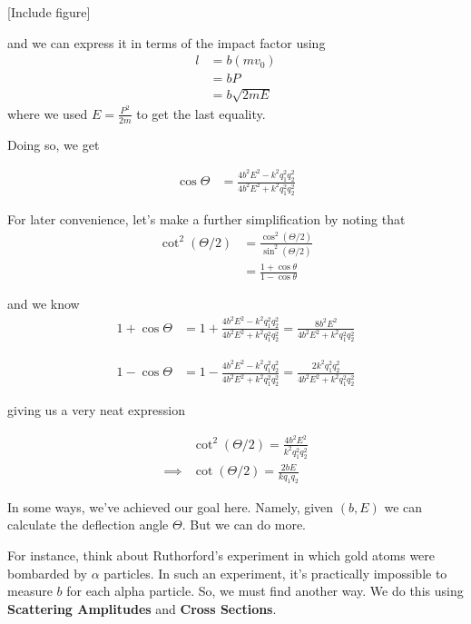 \documentclass[11pt]{article}
\begin{document}
\vskip 0.5cm
[Include figure]
\vskip 0.5cm

and we can express it in terms of the impact factor using
\begin{align*}
  l &= b(mv_0) \\
  &= b P \\
  &= b \sqrt{2mE} 
\end{align*}
where we used $E = \frac{P^2}{2m}$ to get the last equality.

\vskip 0.5cm
Doing so, we get 

\begin{align*}
  \cos\Theta &= \frac{4b^2 E^2 - k^2 q_1^2 q_2^2}{4b^2 E^2 + k^2 q_1^2 q_2^2}
\end{align*}

\vskip 0.5cm
For later convenience, let's make a further simplification by noting that 
\begin{align*}
  \cot^2\left(\Theta/2\right) &= \frac{\cos^2\left(\Theta/2\right)}{\sin^2\left(\Theta/2\right)} \\
  &= \frac{1 + \cos\theta}{1 - \cos\theta}
\end{align*}

and we know 
\begin{align*}
  1 + \cos\Theta &= 1 + \frac{4b^2 E^2 - k^2 q_1^2 q_2^2}{4b^2 E^2 + k^2 q_1^2 q_2^2} = \frac{8b^2 E^2}{4b^2 E^2 + k^2 q_1^2 q_2^2}
\end{align*}

\begin{align*}
  1 - \cos\Theta &= 1 - \frac{4b^2 E^2 - k^2 q_1^2 q_2^2}{4b^2 E^2 + k^2 q_1^2 q_2^2} = \frac{2k^2 q_1^2 q_2^2}{4b^2 E^2 + k^2 q_1^2 q_2^2}
\end{align*}

giving us a very neat expression

\begin{align*}
  &\cot^2(\Theta/2) = \frac{4b^2 E^2}{k^2 q_1^2 q_2^2} \\
  \implies& \boxed{ \cot(\Theta/2) = \frac{2b E}{k q_1 q_2} }
\end{align*}


\vskip 0.5cm
In some ways, we've achieved our goal here. Namely, given $(b, E)$ we can calculate the deflection angle $\Theta$. But we can do more.

\vskip 0.5cm
For instance, think about Ruthorford's experiment in which gold atoms were bombarded by $\alpha$ particles. In such an experiment, it's practically impossible to measure $b$ for each alpha particle. So, we must find another way. We do this using \textbf{Scattering Amplitudes} and \textbf{Cross Sections}.
\end{document}

